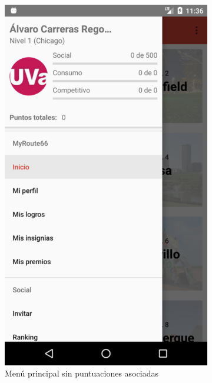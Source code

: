 \documentclass[twoside]{report}
\begin{document}
\begin{figure}[H]
\begin{center}
\begin{subfigure}[t]{.3\linewidth}
		\includegraphics[scale=0.2]{images/userguide/2.png}
		\caption{Menú principal sin puntuaciones asociadas}
	\end{subfigure}\hspace{3mm}%
	\begin{subfigure}[t]{.3\linewidth}

\end{subfigure}
\end{center}
\end{figure}
\end{document}
